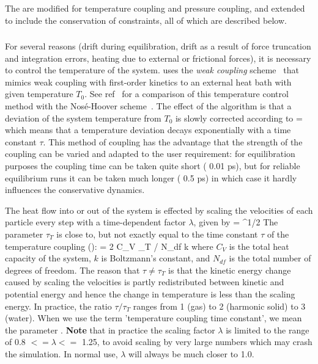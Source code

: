 The  are modified for temperature coupling
 and pressure coupling, and extended to include the conservation of
constraints, all of which are described below.

\subsubsection{}
For several reasons (drift during equilibration, drift as a result of
force truncation and integration errors, heating due to external or
frictional forces), it is necessary to control the temperature of the
system. {\gromacs} uses the {\em weak coupling} scheme~\cite{Berendsen84}
that mimics weak coupling with first-order kinetics to an external
heat bath with given temperature $T_0$. See ref~\cite{Berendsen91} for
a comparison of this temperature control method with the
Nos{\'e}-Hoover scheme~\cite{Nose84,Hoover85}. The effect of the algorithm is
that a deviation of the system temperature from $T_0$ is slowly
corrected according to
\beq
{} = 
\label{eqn:Tcoupling}
\eeq
which means that a temperature deviation decays exponentially with a
time constant $\tau$.
This method of coupling has the advantage that the strength of the
coupling can be varied and adapted to the user requirement: for
equilibration purposes the coupling time can be taken quite short
({\eg} 0.01 ps), but for reliable equilibrium runs it can be taken much
longer ({\eg} 0.5 ps) in which case it hardly influences the
conservative dynamics.
 
The heat flow into or out of the system is effected by scaling the
velocities of each particle every step with a time-dependent factor
$\lambda$, given by
\beq 
\lambda = ^{1/2}
\label{eqn:lambda}
\eeq
The parameter $\tau_T$ is close to, but not exactly equal to the time constant
$\tau$ of the temperature coupling ():
\beq
\tau = 2 C_V \tau_T / N_{df} k
\eeq
where $C_V$ is the total heat capacity of the system, $k$ is Boltzmann's
constant, and $N_{df}$ is the total number of degrees of freedom. The
reason that $\tau \neq \tau_T$ is that the kinetic energy change
caused by scaling the velocities is partly redistributed between
kinetic and potential energy and hence the change in temperature is
less than the scaling energy.  In practice, the ratio $\tau / \tau_T$
ranges from 1 (gas) to 2 (harmonic solid) to 3 (water). When we use
the term 'temperature coupling time constant', we mean the parameter
.  
{\bf Note} that in practice the scaling factor $\lambda$ is limited to 
the range of 0.8 $<= \lambda <=$ 1.25, to avoid scaling by very large
numbers which may crash the simulation. In normal use, 
$\lambda$ will always be much closer to 1.0.
  
